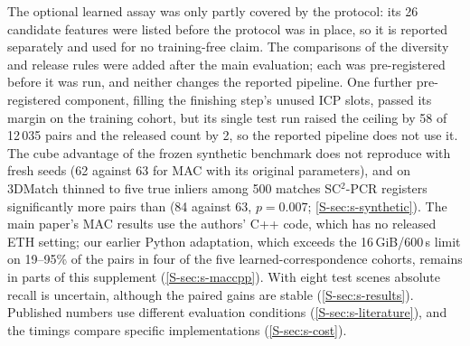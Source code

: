 The optional learned assay was only partly covered by the protocol: its 26 candidate features were listed before the protocol was in place, so it is reported separately and used for no training-free claim. The comparisons of the diversity and release rules were added after the main evaluation; each was pre-registered before it was run, and neither changes the reported pipeline. One further pre-registered component, filling the finishing step's unused ICP slots, passed its margin on the training cohort, but its single test run raised the ceiling by 58 of 12\,035 pairs and the released count by 2, so the reported pipeline does not use it. The cube advantage of the frozen synthetic benchmark does not reproduce with fresh seeds (62 against 63 for MAC with its original parameters), and on 3DMatch thinned to five true inliers among 500 matches SC$^2$-PCR registers significantly more pairs than \ls{} (84 against 63, $p=0.007$; \cref{S-sec:s-synthetic}). The main paper's MAC results use the authors' C++ code, which has no released ETH setting; our earlier Python adaptation, which exceeds the 16\,GiB/600\,s limit on 19--95\% of the pairs in four of the five learned-correspondence cohorts, remains in parts of this supplement (\cref{S-sec:s-maccpp}). With eight test scenes absolute recall is uncertain, although the paired gains are stable (\cref{S-sec:s-results}). Published numbers use different evaluation conditions (\cref{S-sec:s-literature}), and the timings compare specific implementations (\cref{S-sec:s-cost}).
